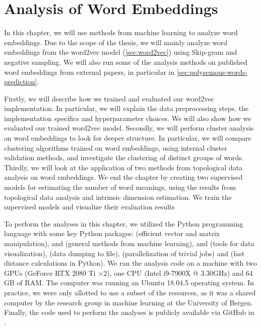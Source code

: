 \chapter{Analysis of Word Embeddings}
\label{chap:analysis-of-word-embeddings}
In this chapter, we will use methods from machine learning to analyze word embeddings. Due to the scope of the thesis, we will mainly analyze word embeddings from the word2vec model (\cref{sec:word2vec}) using Skip-gram and negative sampling. We will also run some of the analysis methods on published word embeddings from external papers, in particular in \cref{sec:polysemous-words-prediction}.

Firstly, we will describe how we trained and evaluated our word2vec implementation. In particular, we will explain the data preprocessing steps, the implementation specifics and hyperparameter choices. We will also show how we evaluated our trained word2vec model. Secondly, we will perform cluster analysis on word embeddings to look for deeper structure. In particular, we will compare clustering algorithms trained on word embeddings, using internal cluster validation methods, and investigate the clustering of distinct groups of words. Thirdly, we will look at the application of two methods from topological data analysis on word embeddings. We end the chapter by creating two supervised models for estimating the number of word meanings, using the results from topological data analysis and intrinsic dimension estimation. We train the supervised models and visualize their evaluation results

To perform the analyses in this chapter, we utilized the Python programming language with some key Python packages:  \cite{2020NumPy-Array} (efficient vector and matrix manipulation),  \cite{ScikitLearn2011} and  \cite{2020SciPy-NMeth} (general methods from machine learning),  \cite{Matplotlib2007} and  \cite{seaborn2021} (tools for data visualization),  \cite{joblib2021} (data dumping to file),  \cite{sharedmem2020} (parallelization of trivial jobs) and  \cite{fastdist2021} (fast distance calculations in Python). We ran the analysis code on a machine with two GPUs (GeForce RTX 2080 Ti $\times2$), one CPU (Intel i9-7900X @ 3.30GHz) and 64 GB of RAM. The computer was running an Ubuntu 18.04.5 operating system. In practice, we were only allotted to use a subset of the resources, as it was a shared computer by the research group in machine learning at the University of Bergen. Finally, the code used to perform the analyses is publicly available via GitHub in \cite{Triki2021}.



